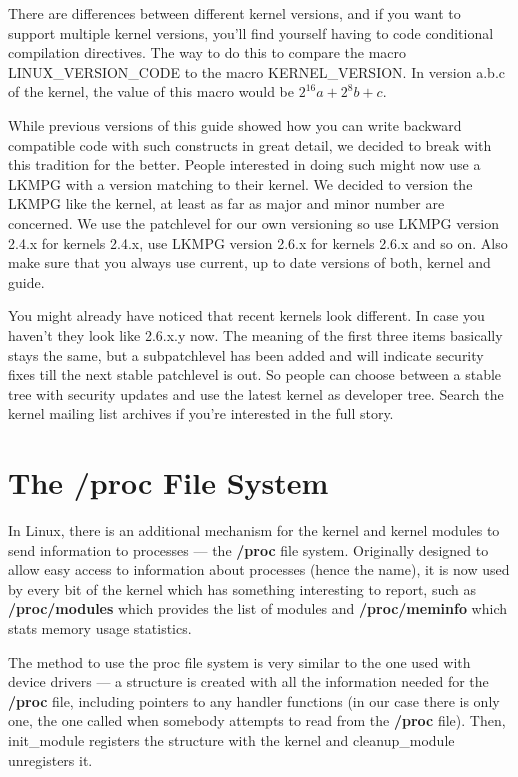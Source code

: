 \documentclass[11pt]{article}
\begin{document}
There are differences between different kernel versions, and if you want to support multiple kernel versions, you'll find yourself having to code conditional compilation directives. The way to do this to compare the macro LINUX\_VERSION\_CODE to the macro KERNEL\_VERSION. In version a.b.c of the kernel, the value of this macro would be $2^{16}a+2^{8}b+c$.

While previous versions of this guide showed how you can write backward compatible code with such constructs in great detail, we decided to break with this tradition for the better. People interested in doing such might now use a LKMPG with a version matching to their kernel. We decided to version the LKMPG like the kernel, at least as far as major and minor number are concerned. We use the patchlevel for our own versioning so use LKMPG version 2.4.x for kernels 2.4.x, use LKMPG version 2.6.x for kernels 2.6.x and so on. Also make sure that you always use current, up to date versions of both, kernel and guide.

You might already have noticed that recent kernels look different. In case you haven't they look like 2.6.x.y now. The meaning of the first three items basically stays the same, but a subpatchlevel has been added and will indicate security fixes till the next stable patchlevel is out. So people can choose between a stable tree with security updates and use the latest kernel as developer tree. Search the kernel mailing list archives if you're interested in the full story.

\section*{The /proc File System}
\label{sec-7}
In Linux, there is an additional mechanism for the kernel and kernel modules to send information to processes --- the \textbf{/proc} file system. Originally designed to allow easy access to information about processes (hence the name), it is now used by every bit of the kernel which has something interesting to report, such as \textbf{/proc/modules} which provides the list of modules and \textbf{/proc/meminfo} which stats memory usage statistics.

The method to use the proc file system is very similar to the one used with device drivers --- a structure is created with all the information needed for the \textbf{/proc} file, including pointers to any handler functions (in our case there is only one, the one called when somebody attempts to read from the \textbf{/proc} file). Then, init\_module registers the structure with the kernel and cleanup\_module unregisters it.
\end{document}
